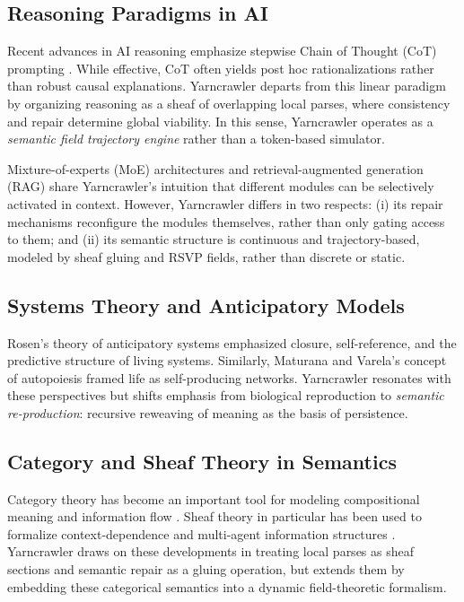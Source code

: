 \documentclass{article}
\begin{document}
\subsection{Reasoning Paradigms in AI}
Recent advances in AI reasoning emphasize stepwise Chain of Thought (CoT) prompting \citep{wei2022cot}. 
While effective, CoT often yields post hoc rationalizations rather than robust causal explanations. 
Yarncrawler departs from this linear paradigm by organizing reasoning as a sheaf of overlapping local parses, where consistency and repair determine global viability. 
In this sense, Yarncrawler operates as a \emph{semantic field trajectory engine} rather than a token-based simulator.

Mixture-of-experts (MoE) architectures \citep{shazeer2017moe} and retrieval-augmented generation (RAG) \citep{lewis2020rag} share Yarncrawler’s intuition that different modules can be selectively activated in context. 
However, Yarncrawler differs in two respects: (i) its repair mechanisms reconfigure the modules themselves, rather than only gating access to them; and (ii) its semantic structure is continuous and trajectory-based, modeled by sheaf gluing and RSVP fields, rather than discrete or static.

\subsection{Systems Theory and Anticipatory Models}
Rosen’s theory of anticipatory systems \citep{rosen1985anticipatory} emphasized closure, self-reference, and the predictive structure of living systems. 
Similarly, Maturana and Varela’s concept of autopoiesis \citep{varela1980autopoiesis} framed life as self-producing networks. 
Yarncrawler resonates with these perspectives but shifts emphasis from biological reproduction to \emph{semantic re-production}: recursive reweaving of meaning as the basis of persistence.

\subsection{Category and Sheaf Theory in Semantics}
Category theory has become an important tool for modeling compositional meaning and information flow \citep{abramsky2009categorical,coecke2017picturing}. 
Sheaf theory in particular has been used to formalize context-dependence and multi-agent information structures \citep{abramsky2011sheaf,spivak2014category}. 
Yarncrawler draws on these developments in treating local parses as sheaf sections and semantic repair as a gluing operation, but extends them by embedding these categorical semantics into a dynamic field-theoretic formalism.
\end{document}
